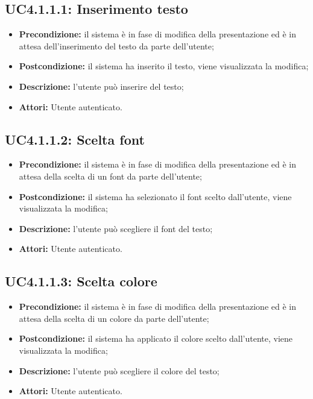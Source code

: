 \subsection{ UC4.1.1.1: Inserimento testo}

\begin{itemize}
	\item \textbf{Precondizione:} il sistema è in fase di modifica della presentazione ed è in attesa dell'inserimento del testo da parte dell'utente;
	\item \textbf{Postcondizione:} il sistema ha inserito il testo, viene visualizzata la modifica;
	\item \textbf{Descrizione:} l'utente può inserire del testo;
	\item \textbf{Attori:} Utente autenticato.
\end{itemize}
\subsection{ UC4.1.1.2: Scelta font}

\begin{itemize}
	\item \textbf{Precondizione:} il sistema è in fase di modifica della presentazione ed è in attesa della scelta di un font da parte dell'utente;
	\item \textbf{Postcondizione:} il sistema ha selezionato il font scelto dall'utente, viene visualizzata la modifica;
	\item \textbf{Descrizione:} l'utente può scegliere il font del testo;
	\item \textbf{Attori:} Utente autenticato.
\end{itemize}
\subsection{ UC4.1.1.3: Scelta colore}

\begin{itemize}
	\item \textbf{Precondizione:} il sistema è in fase di modifica della presentazione ed è in attesa della scelta di un colore da parte dell'utente;
	\item \textbf{Postcondizione:} il sistema ha applicato il colore scelto dall'utente, viene visualizzata la modifica;
	\item \textbf{Descrizione:} l'utente può scegliere il colore del testo;
	\item \textbf{Attori:} Utente autenticato.
\end{itemize}
